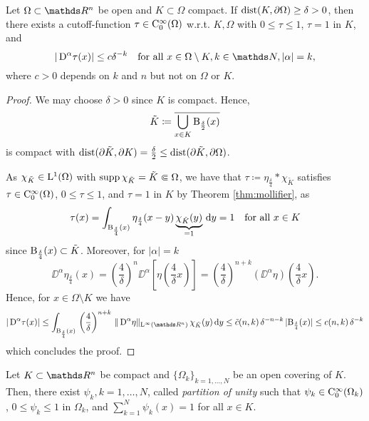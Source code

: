 \begin{lem}
  \label{lem:cutoff}
  Let $\Omega \subset \R^n$ be open and $K \subset \Omega$ compact.
  If $\operatorname{dist}(K, \partial \Omega) \geq \delta > 0$, then there exists a cutoff\hyp{}function $\tau \in \mathrm{C}_0^\infty(\Omega)$ w.r.t. $K, \Omega$ with $0 \leq \tau \leq 1$, $\tau = 1$ in $K$, and 
  $$
|\DD^\alpha \tau(x) | \leq c \delta^{-k} \quad\text{for all } x \in \Omega \setminus K, k \in \N , |\alpha| = k,
  $$ 
  where $c > 0$ depends on $k$ and $n$ but not on $\Omega$ or $K$.
\end{lem}

\begin{proof}
  We may choose $\delta > 0$ since $K$ is compact.
  Hence, 
  $$
  \tilde K \coloneqq \overline{\bigcup_{x \in K} \mathrm{B}_{\frac{\delta}{2}}(x)}
  $$
  is compact with $\operatorname{dist}(\partial \tilde K, \partial K) = \frac{\delta}{2} \leq \operatorname{dist}(\partial \tilde K, \partial \Omega)$.

  As $\chi_{\tilde K} \in \mathrm{L}^1(\Omega)$ with $\operatorname{supp} \chi_{\tilde K} = \tilde K \Subset \Omega$, we have that $\tau \coloneqq \eta_{\frac{\delta}{4}} \ast \chi_{\tilde K}$ satisfies $\tau \in \mathrm{C}_0^\infty(\Omega)$, $0 \leq \tau \leq 1$, and $\tau = 1$ in $K$ by Theorem \ref{thm:mollifier}, as
  $$
  \tau(x) 
  = \int_{\mathrm{B}_{\frac{\delta}{4}}(x)}\eta_{\frac{\delta}{4}}(x - y) \underbrace{\chi_{\tilde K}(y)}_{= 1} \, {\operatorname{d}\!{y}} 
  = 1 \quad\text{for all }x \in K
  $$
  since $\mathrm{B}_{\frac{\delta}{4}}(x) \subset \tilde K$.
  Moreover, for $|\alpha| = k$
  $$
  \DD^\alpha \eta_{\frac{\delta}{4}}(x) 
  = \left( \frac{4}{\delta}\right)^n \DD^\alpha \left[ \eta \left( \frac{4 }{\delta} x \right) \right] 
  =  \left( \frac{4}{\delta}\right)^{n+k} (\DD^\alpha \eta)\left( \frac{4}{\delta} x \right).
  $$
  Hence, for $x \in \Omega \setminus K$ we have 
  $$
    |\DD^\alpha \tau (x) | 
    \leq \int_{\BB_{\frac{\delta}{4}}(x)}\, \left(\frac{4}{\delta}\right)^{n + k}\, \|\DD^\alpha \eta \|_{\Ell^\infty(\R^n)} \,\chi_{\tilde K}(y) \d y
    \leq \tilde c(n,k) \, \delta^{-n - k} \, |\BB_{\frac{\delta}{4}}(x)| \leq c(n,k)\, \delta^{-k}
 $$
 which concludes the proof.
\end{proof}

\begin{lem}
  \label{lem:partitionOfUnity}
  Let $K \subset \R^n$ be compact and $\{\Omega_k\}_{k = 1,\dots,N}$ be an open covering of $K$.
  Then, there exist $\psi_k, k=1,\dots,N$, called \emph{partition of unity} such that $\psi_k \in \mathrm{C}_0^\infty(\Omega_k)$, $0 \leq \psi_k \leq 1$ in $\Omega_k$, and $\sum_{k = 1}^N \psi_k(x) = 1$ for all $x \in K$.
\end{lem}

